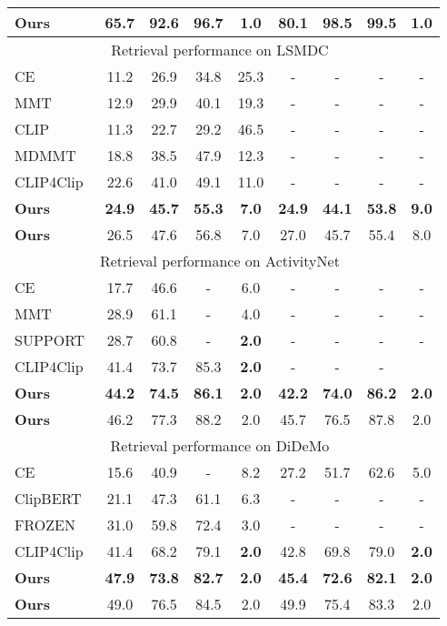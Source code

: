\documentclass[runningheads]{llncs}
\begin{document}
\begin{table}[H]
\begin{tabular}{lcccccccc}
\rowcolor{Gray}
\textbf{Ours}& 65.7 & 92.6 & 96.7 & 1.0  & 80.1 & 98.5  & 99.5  &  1.0\\
\bottomrule
\multicolumn{9}{c}{Retrieval performance on LSMDC~\cite{lsmdc}} \\
\hline
CE~\cite{ce}&  11.2 &26.9 &34.8& 25.3&- &- &-& - \\
MMT~\cite{mmt}&  12.9 &29.9 &40.1& 19.3&- &- &-& - \\
CLIP~\cite{clip}&   11.3& 22.7& 29.2& 46.5 &- &- &-& - \\
MDMMT~\cite{mmt}&   18.8& 38.5& 47.9&12.3& -& -& -& - \\
CLIP4Clip~\cite{clip4clip}&  22.6& 41.0 &49.1&11.0& -&-&-&- \\
\rowcolor{Gray}
\textbf{Ours}&  \textbf{24.9 }  & \textbf{45.7} & \textbf{55.3}  & \textbf{7.0} & \textbf{24.9}  &\textbf{44.1 } & \textbf{53.8} & \textbf{9.0}  \\
\rowcolor{Gray}
\textbf{Ours}&   26.5  &47.6 & 56.8  & 7.0 & 27.0 &45.7 & 55.4 & 8.0  \\
\bottomrule 
\multicolumn{9}{c}{Retrieval performance on ActivityNet~\cite{anet}} \\
\hline
CE~\cite{ce}&   17.7& 46.6& -&6.0&-&-&-&-\\
MMT~\cite{mmt}&   28.9& 61.1 &-&4.0& -& -& -& - \\
SUPPORT\cite{support} &28.7& 60.8& -&\textbf{2.0}&-& -& -& - \\
CLIP4Clip~\cite{clip4clip}&  41.4& 73.7 &85.3& \textbf{2.0}&-&-&-& \\
\rowcolor{Gray}
\textbf{Ours}&  \textbf{44.2} &\textbf{74.5}& \textbf{86.1}& \textbf{2.0} & \textbf{42.2} & \textbf{74.0} &\textbf{86.2} & \textbf{2.0}\\
\rowcolor{Gray}
\textbf{Ours}&  46.2  & 77.3 & 88.2 & 2.0 & 45.7  &76.5 & 87.8 & 2.0   \\
\bottomrule
\multicolumn{9}{c}{Retrieval performance on DiDeMo~\cite{didemo}} \\
\hline
CE~\cite{ce}&   15.6& 40.9 &-&8.2 &27.2 &51.7 &62.6& 5.0 \\
ClipBERT~\cite{clipbert}&   21.1& 47.3 &61.1 &6.3& -& -& -& - \\
FROZEN~\cite{frozen} &31.0 &59.8 &72.4& 3.0&-&-&-&-\\
CLIP4Clip~\cite{clip4clip}&  41.4 & 68.2& 79.1 & \textbf{2.0} & 42.8  & 69.8  & 79.0& \textbf{2.0} \\
\rowcolor{Gray}
\textbf{Ours}&  \textbf{47.9}  & \textbf{73.8} & \textbf{82.7} & \textbf{2.0} & \textbf{45.4}  & \textbf{72.6} & \textbf{82.1}  & \textbf{2.0}   \\
\rowcolor{Gray}
\textbf{Ours}&   49.0  & 76.5 & 84.5 & 2.0 & 49.9  &75.4 & 83.3 & 2.0   \\
\bottomrule
\end{tabular}
\label{tab:sota_sum}
\vspace{-4mm}
\end{table}
\end{document}
